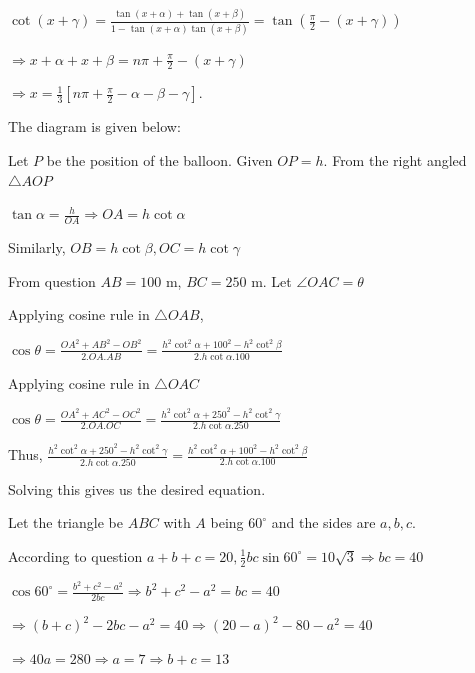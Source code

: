   $\cot(x + \gamma) = \frac{\tan(x + \alpha) + \tan(x + \beta)}{1 - \tan(x + \alpha)\tan(x + \beta)}
  = \tan\left(\frac{\pi}{2} - (x + \gamma)\right)$

  $\Rightarrow x + \alpha + x + \beta = n\pi + \frac{\pi}{2} - (x + \gamma)$

  $\Rightarrow x = \frac{1}{3}\left[n\pi + \frac{\pi}{2} - \alpha - \beta - \gamma\right]$.

  \startplacefigure[reference=fig:17_5, force]
    \externalfigure[17_5.pdf]
  \stopplacefigure
\item The diagram is given below:

  \startplacefigure
    \externalfigure[17_6.pdf]
  \stopplacefigure

  Let $P$ be the position of the balloon. Given $OP = h$. From the right angled $\triangle AOP$

  $\tan\alpha = \frac{h}{OA} \Rightarrow OA = h\cot\alpha$

  Similarly, $OB = h\cot\beta, OC = h\cot\gamma$

  From question $AB = 100$ m, $BC = 250$ m. Let $\angle OAC = \theta$

  Applying cosine rule in $\triangle OAB$,

  $\cos\theta = \frac{OA^2 + AB^2 - OB^2}{2.OA.AB} = \frac{h^2\cot^2\alpha + 100^2 -
  h^2\cot^2\beta}{2.h\cot\alpha.100}$

  Applying cosine rule in $\triangle OAC$

  $\cos\theta = \frac{OA^2 + AC^2 - OC^2}{2.OA.OC} = \frac{h^2\cot^2\alpha + 250^2 -
    h^2\cot^2\gamma}{2.h\cot\alpha.250}$

  Thus, $\frac{h^2\cot^2\alpha + 250^2 - h^2\cot^2\gamma}{2.h\cot\alpha.250} = \frac{h^2\cot^2\alpha +
  100^2 - h^2\cot^2\beta}{2.h\cot\alpha.100}$

  Solving this gives us the desired equation.
\item Let the triangle be $ABC$ with $A$ being $60^\circ$ and the sides are $a, b, c$.

  According to question $a + b + c = 20, \frac{1}{2}bc\sin60^\circ = 10\sqrt{3}\Rightarrow bc = 40$

  $\cos60^\circ = \frac{b^2 + c^2 - a^2}{2bc} \Rightarrow b^2 + c^2 - a^2 = bc = 40$

  $\Rightarrow (b + c)^2 - 2bc - a^2 = 40 \Rightarrow (20 - a)^2 - 80 - a^2 = 40$

  $\Rightarrow 40a = 280 \Rightarrow a = 7 \Rightarrow b + c = 13$

